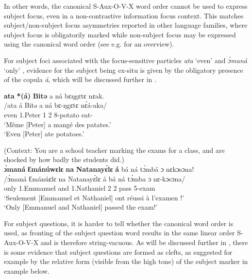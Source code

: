 \documentclass[output=paper,colorlinks,citecolor=brown
]{langscibook}
\begin{document}
\z

In other words, the canonical S-Aux-O-V-X word order cannot be used to express subject focus, even in a non-contrastive information focus context. This matches subject/non-subject focus asymmetries reported in other language families, where subject focus is obligatorily marked while non-subject focus may be expressed using the canonical word order (see e.g. \citealt{FiedlerEtAl2010} for an overview).
 
For subject foci associated with the focus-sensitive particles \textit{ata} `even'  and \textit{ɔ́maná} `only' , evidence for the subject being ex-situ is given by the obligatory presence of the copula \textit{á}, which will be discussed further in .

\ea \label{evenpeterate}
\ea
\glll
{\db}\textbf{ata} \textbf{*(á)} \textbf{Bitə} a ná bɛŋgɛtɛ nɛak. \\
/ata á Bitə a ná bɛ-ŋgɛtɛ nɛ́á-aka/ \\
{\db}even \COP{} 1.Peter 1\SM{} \PST{}2{} 8-potato eat-\DUR{} \\
\glt
`Même [Peter]\textsubscript{\FOC{}} a mangé des patates.' \\ `Even [Peter]\textsubscript{\FOC{}} ate potatoes.' \jambox*{[PM 2260] }

\pagebreak
\ex
\label{onlyemanuel}
(Context: You are a school teacher marking the exams for a class, and are shocked by how badly the students did.) \\ 
\glll
{\db}\textbf{ɔ́maná} \textbf{Ɛmánúwɛlɛ} \textbf{na} \textbf{Natanayɛ́lɛ} \textbf{á} bá ná tɔ́mbá ɔ nɛkɔsɔna! \\
/ɔ́maná Ɛmánúɛlɛ na Natanayɛ́lɛ á bá ná tɔ́mba ɔ nɛ-kɔsɔna/ \\
{\db}only 1.Emmanuel and 1.Nathaniel \COP{} 2\SM{} \PST{}2{} pass \PREP{} 5-exam \\
\glt
`Seulement [Emmanuel et Nathaniel]\textsubscript{\FOC{}} ont réussi à l'examen !' \\ `Only [Emmanuel and Nathaniel]\textsubscript{\FOC{}} passed the exam!' \jambox*{[JO 527] }

\z
\z

For subject questions, it is harder to tell whether the canonical word order is used, as fronting of the subject question word results in the same linear order S-Aux-O-V-X and is therefore string-vacuous. As will be discussed further in , there is some evidence that subject questions are formed as clefts, as suggested for example by the relative form (visible from the high tone) of the subject marker in example  below.
\end{document}
